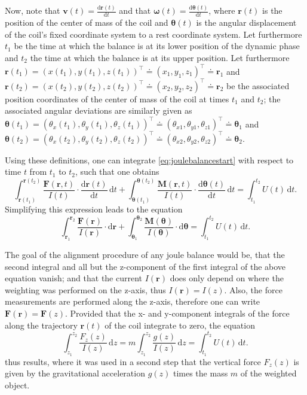 \documentclass{report}
\numberwithin{tm}{section}
\newcommand\vect[1]{\ensuremath{\bm{#1}}}
\begin{document}
Now, note that $\vect{v}(t) = \frac{\mathrm{d}\vect{r}(t)}{\mathrm{d}t}$ and that $\vect{\omega}(t) = \frac{\mathrm{d}\vect{\theta}(t)}{\mathrm{d}t}$, where $\vect{r}(t)$ is the position of the center of mass of the coil and $\vect{\theta}(t)$ is the angular displacement of the coil's fixed coordinate system to a rest coordinate system. Let furthermore $t_1$ be the time at which the balance is at its lower position of the dynamic phase and $t_2$ the time at which the balance is at its upper position. Let furthermore $\vect{r}(t_1) = (x(t_1), y(t_1), z(t_1))^\top \doteq (x_1, y_1, z_1)^\top \doteq \vect{r}_1$ and $\vect{r}(t_2) = (x(t_2), y(t_2), z(t_2))^\top \doteq (x_2, y_2, z_2)^\top \doteq \vect{r}_2$ be the associated position coordinates of the center of mass of the coil at times $t_1$ and $t_2$; the associated angular deviations are similarly given as $\vect{\theta}(t_1) = (\theta_x(t_1), \theta_y(t_1), \theta_z(t_1))^\top \doteq (\theta_{x1}, \theta_{y1}, \theta_{z1})^\top \doteq \vect{\theta}_1$ and  $\vect{\theta}(t_2) = (\theta_x(t_2), \theta_y(t_2), \theta_z(t_2))^\top \doteq (\theta_{x2}, \theta_{y2}, \theta_{z2})^\top \doteq \vect{\theta}_2$.

Using these definitions, one can integrate \cref{eq:joulebalancestart} with respect to time $t$ from $t_1$ to $t_2$, such that one obtains \begin{equation}
	\int_{\vect{r}(t_1)}^{\vect{r}(t_2)}\frac{\vect{F}(\vect{r},t)}{I(t)}\cdot \frac{\mathrm{d}\vect{r}(t)}{\mathrm{d}t}\,\mathrm{d}t + \int_{\vect{\theta}(t_1)}^{\vect{\theta}(t_2)}\frac{\vect{M}(\vect{r},t)}{I(t)}\cdot \frac{\mathrm{d}\vect{\theta}(t)}{\mathrm{d}t}\,\mathrm{d}t = \int_{t_1}^{t_2}U(t)\,\mathrm{d}t.
\end{equation} Simplifying this expression leads to the equation \begin{equation}
\int_{\vect{r}_1}^{\vect{r}_2}\frac{\vect{F}(\vect{r})}{I(\vect{r})}\cdot \mathrm{d}\vect{r} + \int_{\vect{\theta}_1}^{\vect{\theta}_2}\frac{\vect{M}(\vect{\theta})}{I(\vect{\theta})}\cdot \mathrm{d}\vect{\theta} = \int_{t_1}^{t_2}U(t)\,\mathrm{d}t.
\end{equation} 

The goal of the alignment procedure of any joule balance would be, that the second integral and all but the z-component of the first integral of the above equation vanish; and that the current $I(\vect{r})$ does only depend on where the weighting was performed on the z-axis, thus $I(\vect{r}) = I(z)$. Also, the force measurements are performed along the z-axis, therefore one can write $\vect{F}(\vect{r}) = \vect{F}(z)$. Provided that the x- and y-component integrals of the force along the trajectory $\vect{r}(t)$ of the coil integrate to zero, the equation \begin{equation}\label{eq:joule_first_int_equation}
	\int_{z_1}^{z_2} \frac{F_z(z)}{I(z)}\,\mathrm{d}z = m\int_{z_1}^{z_2} \frac{g(z)}{I(z)}\,\mathrm{d}z = \int_{t_1}^{t_2}U(t)\,\mathrm{d}t.
\end{equation} thus results, where it was used in a second step that the vertical force $F_z(z)$ is given by the gravitational acceleration $g(z)$ times the mass $m$ of the weighted object.
\end{document}
